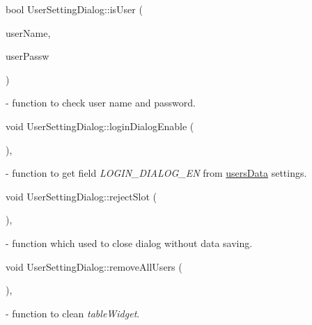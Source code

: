 \mbox{\label{classUserSettingDialog_a10640f3e9a3935beba233c3bf7f1bb63}} 
{\footnotesize\ttfamily bool User\+Setting\+Dialog\+::\texorpdfstring{is\+User}{isUser} (\begin{DoxyParamCaption}\item[{Q\+String}]{user\+Name,  }\item[{Q\+String}]{user\+Passw }\end{DoxyParamCaption})} - function to check user name and password.

\mbox{\label{classUserSettingDialog_a9d077edc4d7cc247f8e57d1d6e8d7f89}} 
{\footnotesize\ttfamily void User\+Setting\+Dialog\+::\texorpdfstring{login\+Dialog\+Enable}{loginDialogEnable} (\begin{DoxyParamCaption}{ }\end{DoxyParamCaption})\hspace{0.3cm}{\ttfamily [private]}, {\ttfamily [slot]}} - function to get field \textit{LOGIN\_DIALOG\_EN} from \hyperlink{classUserSettingDialog_a2ea2a798911a3e2840542d7190613027}{users\+Data} settings.

\mbox{\label{classUserSettingDialog_a46828cbc27d2dd2c587388090207dd8e}} 
{\footnotesize\ttfamily void User\+Setting\+Dialog\+::\texorpdfstring{reject\+Slot}{rejectSlot} (\begin{DoxyParamCaption}{ }\end{DoxyParamCaption})\hspace{0.3cm}{\ttfamily [private]}, {\ttfamily [slot]}} - function which used to close dialog without data saving.

\mbox{\label{classUserSettingDialog_a5f4c353f8768d0225ac84f85607c4b54}} 
{\footnotesize\ttfamily void User\+Setting\+Dialog\+::\texorpdfstring{remove\+All\+Users}{removeAllUsers} (\begin{DoxyParamCaption}{ }\end{DoxyParamCaption})\hspace{0.3cm}{\ttfamily [private]}, {\ttfamily [slot]}} - function to clean \textit{tableWidget}.

